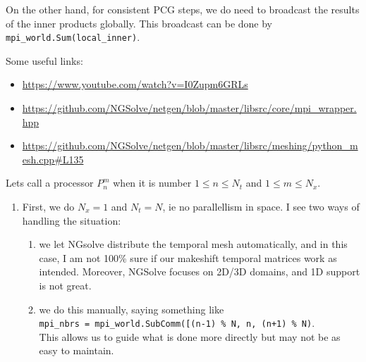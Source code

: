 \documentclass[11pt,a4paper]{amsart}
\theoremstyle{definition}
\begin{document}
On the other hand, for
consistent PCG steps, we do need to broadcast the results of the inner products
globally.  This broadcast can be done by \verb`mpi_world.Sum(local_inner)`.

Some useful links:
\begin{itemize}
  \item \url{https://www.youtube.com/watch?v=I0Zupm6GRLs}
  \item \url{https://github.com/NGSolve/netgen/blob/master/libsrc/core/mpi_wrapper.hpp}
  \item \url{https://github.com/NGSolve/netgen/blob/master/libsrc/meshing/python_mesh.cpp#L135}
\end{itemize}

Lets call a processor $P_n^m$ when it is number $1 \leq n \leq N_t$ and $1 \leq m \leq N_x$.
\begin{enumerate}
  \item First, we do $N_x = 1$ and $N_t = N$, ie no parallellism in space. I see
    two ways of handling the situation:
    \begin{enumerate}
      \item we let NGsolve distribute the temporal
      mesh automatically, and in this case, I am not 100\% sure if our makeshift
      temporal matrices work as intended. Moreover, NGSolve focuses on 2D/3D domains,
      and 1D support is not great.
    \item we do this manually, saying something
      like\\
        \verb`mpi_nbrs = mpi_world.SubComm([(n-1) % N, n, (n+1) % N)`. \\
      This allows us to guide what is done more directly but may not be as easy to maintain.
    \end{enumerate}
\end{enumerate}
\end{document}
